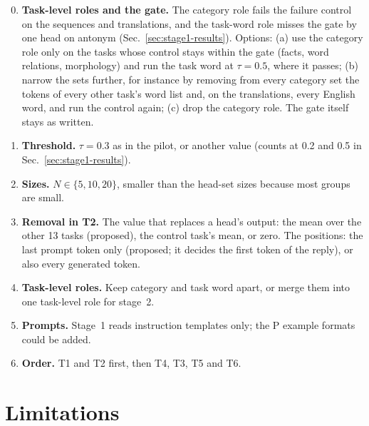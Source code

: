 \documentclass[10pt,a4paper]{article}
\begin{document}
\begin{enumerate}[label=\textbf{D\arabic*}]
\setcounter{enumi}{-1}
\item \textbf{Task-level roles and the gate.} The category role fails the failure control on the sequences and translations, and the task-word role misses the gate by one head on antonym (Sec.~\ref{sec:stage1-results}). Options: (a) use the category role only on the tasks whose control stays within the gate (facts, word relations, morphology) and run the task word at $\tau=0.5$, where it passes; (b) narrow the sets further, for instance by removing from every category set the tokens of every other task's word list and, on the translations, every English word, and run the control again; (c) drop the category role. The gate itself stays as written.
\item \textbf{Threshold.} $\tau=0.3$ as in the pilot, or another value (counts at 0.2 and 0.5 in Sec.~\ref{sec:stage1-results}).
\item \textbf{Sizes.} $N\in\{5,10,20\}$, smaller than the head-set sizes because most groups are small.
\item \textbf{Removal in T2.} The value that replaces a head's output: the mean over the other 13 tasks (proposed), the control task's mean, or zero. The positions: the last prompt token only (proposed; it decides the first token of the reply), or also every generated token.
\item \textbf{Task-level roles.} Keep category and task word apart, or merge them into one task-level role for stage~2.
\item \textbf{Prompts.} Stage~1 reads instruction templates only; the P example formats could be added.
\item \textbf{Order.} T1 and T2 first, then T4, T3, T5 and T6.
\end{enumerate}

\section{Limitations}\label{sec:limits}
\end{document}
